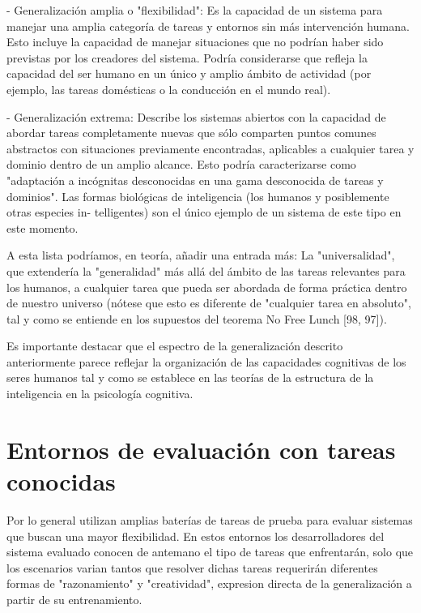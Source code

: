 - Generalización amplia o "flexibilidad": Es la capacidad de un sistema para manejar una amplia categoría de tareas y entornos sin más intervención humana. Esto incluye la capacidad de manejar situaciones que no podrían haber sido previstas por los creadores del sistema. Podría considerarse que refleja la capacidad del ser humano en un único y amplio ámbito de actividad (por ejemplo, las tareas domésticas o la conducción en el mundo real).

- Generalización extrema: Describe los sistemas abiertos con la capacidad de abordar tareas completamente nuevas que sólo comparten puntos comunes abstractos con situaciones previamente encontradas, aplicables a cualquier tarea y dominio dentro de un amplio alcance. Esto podría caracterizarse como "adaptación a incógnitas desconocidas en una gama desconocida de tareas y dominios". Las formas biológicas de inteligencia (los humanos y posiblemente otras especies in- telligentes) son el único ejemplo de un sistema de este tipo en este momento.

A esta lista podríamos, en teoría, añadir una entrada más: La "universalidad", que extendería la "generalidad" más allá del ámbito de las tareas relevantes para los humanos, a cualquier tarea que pueda ser abordada de forma práctica dentro de nuestro universo (nótese que esto es diferente de "cualquier tarea en absoluto", tal y como se entiende en los supuestos del teorema No Free Lunch [98, 97]).



Es importante destacar que el espectro de la generalización descrito anteriormente parece reflejar la organización de las capacidades cognitivas de los seres humanos tal y como se establece en las teorías de la estructura de la inteligencia en la psicología cognitiva.

\section{Entornos de evaluación con tareas conocidas}\label{section:state-of-the-art:evaluation-enviroments-with-know-tasks}

Por lo general utilizan amplias baterías de tareas de prueba para evaluar sistemas que buscan una mayor flexibilidad. En estos entornos los desarrolladores del sistema evaluado conocen de antemano el tipo de tareas que enfrentarán, solo que los escenarios varian tantos que resolver dichas tareas requerirán diferentes formas de "razonamiento" y "creatividad", expresion directa de la generalización a partir de su entrenamiento.

